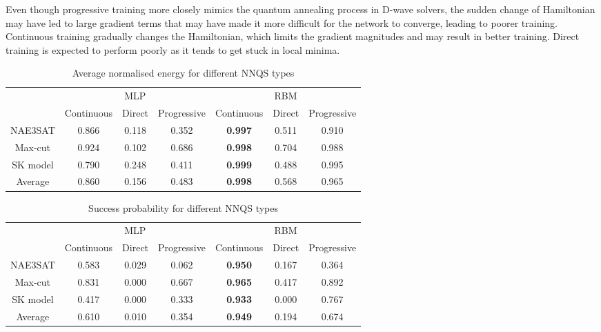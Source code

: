 Even though progressive training more closely mimics the quantum annealing process in D-wave solvers, the sudden change of Hamiltonian may have led to large gradient terms that may have made it more difficult for the network to converge, leading to poorer training. Continuous training gradually changes the Hamiltonian, which limits the gradient magnitudes and may result in better training. Direct training is expected to perform poorly as it tends to get stuck in local minima.


\begin{table}[!htb]
    \centering
    \caption{Average normalised energy for different NNQS types}
    \label{results:nnqsnormalizedenergy}
    \begin{tabular}{ccccccc} \toprule
        ~ & \multicolumn{3}{c}{MLP} & \multicolumn{3}{c}{RBM} \\
        \cmidrule{2-7} & Continuous & Direct & Progressive & Continuous & Direct & Progressive \\
        \midrule
        NAE3SAT & 0.866 & 0.118 & 0.352 & \textbf{0.997} & 0.511 & 0.910 \\
        Max-cut & 0.924 & 0.102 & 0.686 & \textbf{0.998} & 0.704 & 0.988 \\
        SK model & 0.790 & 0.248 & 0.411 & \textbf{0.999} & 0.488 & 0.995 \\ \midrule
        Average & 0.860 & 0.156 & 0.483 & \textbf{0.998} & 0.568 & 0.965 \\ \bottomrule
    \end{tabular}
\end{table}

\begin{table}[!htb]
    \centering
    \caption{Success probability for different NNQS types}
    \label{results:nnqssuccess}
    \begin{tabular}{ccccccc} \toprule
        ~ & \multicolumn{3}{c}{MLP} & \multicolumn{3}{c}{RBM} \\
        \cmidrule{2-7} & Continuous & Direct & Progressive & Continuous & Direct & Progressive \\
        \midrule
        NAE3SAT & 0.583 & 0.029 & 0.062 & \textbf{0.950} & 0.167 & 0.364 \\
        Max-cut & 0.831 & 0.000 & 0.667 & \textbf{0.965} & 0.417 & 0.892 \\
        SK model & 0.417 & 0.000 & 0.333 & \textbf{0.933} & 0.000 & 0.767 \\ \midrule
        Average & 0.610 & 0.010 & 0.354 & \textbf{0.949} & 0.194 & 0.674 \\ \bottomrule
    \end{tabular}
\end{table}